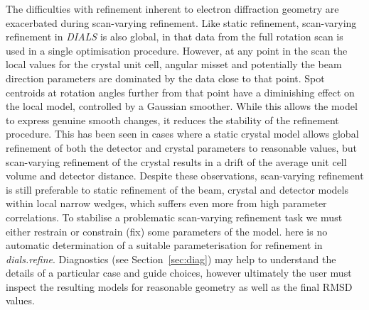 \documentclass[preprint]{iucr}
\newcommand{\dials}{\emph{DIALS}\xspace}
\newcommand{\dialsrefine}{\emph{dials.refine}\xspace}
\begin{document}
The difficulties with refinement inherent to electron diffraction geometry are
exacerbated during scan-varying refinement. Like static
refinement, scan-varying refinement in \dials is also global, in that data from
the full rotation scan is used in a single optimisation procedure. However, at
any point in the scan the local values for the crystal unit cell, angular
misset and potentially the beam direction parameters are dominated by the data
close to that point. Spot centroids
at rotation angles further from that point have a diminishing effect on the
local model, controlled by a Gaussian smoother. While this allows the
model to express genuine smooth changes,
it reduces the stability of the refinement procedure. This has been seen in
cases where a static crystal model allows global refinement of both the
detector and crystal parameters to reasonable values, but scan-varying
refinement of the crystal results in a drift of the average unit cell volume
and detector distance. Despite these observations, scan-varying refinement is
still preferable to static refinement of the beam, crystal and detector models
within local narrow wedges, which suffers even more from high parameter
correlations. To stabilise a problematic scan-varying refinement task we must
either restrain or constrain (fix) some parameters of the model. here is no
automatic determination of a suitable parameterisation for refinement in
\dialsrefine. Diagnostics (see Section~\ref{sec:diag}) may help to understand
the details of a particular case and guide choices, however ultimately the user
must inspect the resulting models for reasonable geometry as well as the final
RMSD values.
\end{document}

